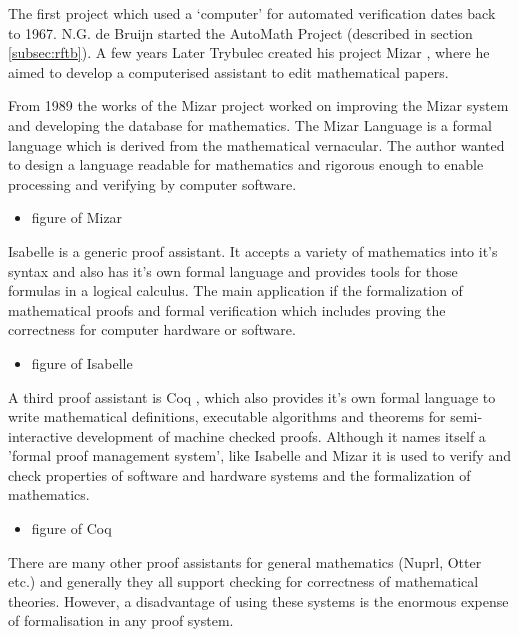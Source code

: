 The first project which used a `computer' for automated verification dates back to 1967. N.G. de Bruijn started the AutoMath Project (described in section \ref{subsec:rftb}). A few years Later Trybulec created his project Mizar \cite{mizar}, where he aimed to develop a computerised assistant to edit mathematical papers.

From 1989 the works of the Mizar project worked on improving the Mizar system and developing the database for mathematics. The Mizar Language is a formal language which is derived from the mathematical vernacular. The author wanted to design a language readable for mathematics and rigorous enough to enable processing and verifying by computer software.

\begin{itemize}
\item figure of Mizar
\end{itemize}

Isabelle \cite{isabelle} is a generic proof assistant. It accepts a variety of mathematics into it's syntax and also has it's own formal language and provides tools for those formulas in a logical calculus. The main application if the formalization of mathematical proofs and formal verification which includes proving the correctness for computer hardware or software.

\begin{itemize}
\item figure of Isabelle
\end{itemize}

A third proof assistant is Coq \cite{coq}, which also provides it's own formal language to write mathematical definitions, executable algorithms and theorems for semi-interactive development of machine checked proofs. Although it names itself a 'formal proof management system', like Isabelle and Mizar it is used to verify and check properties of software and hardware systems and the formalization of mathematics.

\begin{itemize}
\item figure of Coq
\end{itemize}

There are many other proof assistants for general mathematics (Nuprl, Otter etc.) and generally they all support checking for correctness of mathematical theories. However, a disadvantage of using these systems is the enormous expense of formalisation in any proof system. 

